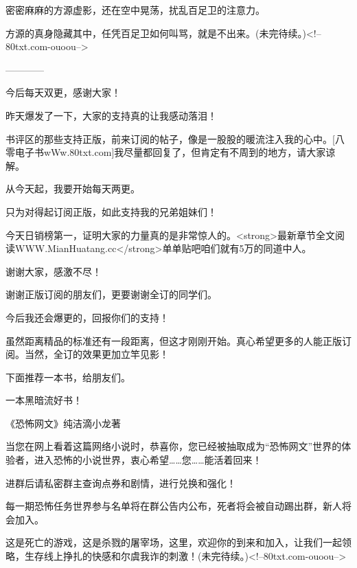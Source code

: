 \begin{this_body}
密密麻麻的方源虚影，还在空中晃荡，扰乱百足卫的注意力。

方源的真身隐藏其中，任凭百足卫如何叫骂，就是不出来。(未完待续。)<!--80txt.com-ouoou-->

------------

今后每天双更，感谢大家！

昨天爆发了一下，大家的支持真的让我感动落泪！

书评区的那些支持正版，前来订阅的帖子，像是一股股的暖流注入我的心中。[八零电子书wWw.80txt.com]我尽量都回复了，但肯定有不周到的地方，请大家谅解。

从今天起，我要开始每天两更。

只为对得起订阅正版，如此支持我的兄弟姐妹们！

今天日销榜第一，证明大家的力量真的是非常惊人的。<strong>最新章节全文阅读WWW.MianHuatang.cc</strong>单单贴吧咱们就有5万的同道中人。

谢谢大家，感激不尽！

谢谢正版订阅的朋友们，更要谢谢全订的同学们。

今后我还会爆更的，回报你们的支持！

虽然距离精品的标准还有一段距离，但这才刚刚开始。真心希望更多的人能正版订阅。当然，全订的效果更加立竿见影！

下面推荐一本书，给朋友们。

一本黑暗流好书！

《恐怖网文》纯洁滴小龙著

当您在网上看着这篇网络小说时，恭喜你，您已经被抽取成为“恐怖网文”世界的体验者，进入恐怖的小说世界，衷心希望……您……能活着回来！

进群后请私密群主查询点券和剧情，进行兑换和强化！

每一期恐怖任务世界参与名单将在群公告内公布，死者将会被自动踢出群，新人将会加入。

这是死亡的游戏，这是杀戮的屠宰场，这里，欢迎你的到来和加入，让我们一起领略，生存线上挣扎的快感和尔虞我诈的刺激！(未完待续。)<!--80txt.com-ouoou-->

\end{this_body}

